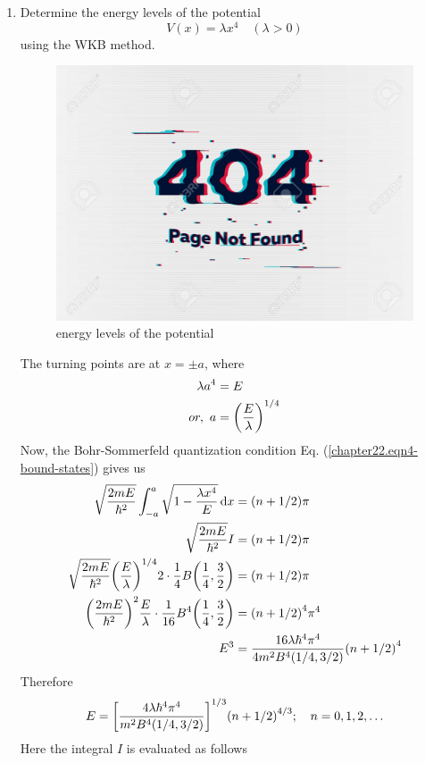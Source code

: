 \begin{enumerate}
	

	
	\item Determine the energy levels of the potential
	\begin{equation*}
	V(x) = \lambda x^4 \quad (\lambda > 0)
	\end{equation*}
	using the WKB method. 
	\begin{figure}
		\centering
		\includegraphics[width=0.5\linewidth]{Pictures/not-found.jpg}
		\caption{energy levels of the potential}
		\label{chapter22.fig7}
	\end{figure}
	The turning points are at $x=\pm a$, where
	\begin{align*}
		\lambda a^4 &= E \\
or,\		a &= \qty(\frac{E}{\lambda})^{1/4}
	\end{align*}
	Now, the Bohr-Sommerfeld quantization condition Eq. (\ref{chapter22.eqn4-bound-states}) gives us
	\begin{align*}
		\sqrt{\frac{2 m E}{\hbar^2}} \int_{-a}^{a} \sqrt{1 - \frac{\lambda x^4}{E}} \dd{x} &= \qty(n + 1/2) \pi \\
		\sqrt{\frac{2 m E}{\hbar^2}} I &= \qty(n + 1/2) \pi \\
		\sqrt{\frac{2 m E}{\hbar^2}} \qty(\frac{E}{\lambda})^{1/4} 2 \cdot \frac{1}{4} B\qty(\frac{1}{4}, \frac{3}{2}) &= \qty(n + 1/2) \pi \\
		\qty(\frac{2 m E}{\hbar^2})^2 \frac{E}{\lambda} \cdot \frac{1}{16} B^4\qty(\frac{1}{4}, \frac{3}{2}) &= \qty(n + 1/2)^4 \pi^4 \\
		E^3 &= \frac{16 \lambda \hbar^4 \pi^4}{4 m^2 B^4(1/4,3/2)} \qty(n + 1/2)^4 \\
	\end{align*}
	Therefore
	\begin{equation}
		E = \qty[\frac{4 \lambda \hbar^4 \pi^4}{m^2 B^4(1/4,3/2)}]^{1/3} \qty(n + 1/2)^{4/3} ; \quad  n = 0,1,2,\ldots
	\end{equation}
	Here the integral $I$ is evaluated as follows
	\begin{align*}

\end{align*}
\end{enumerate}
